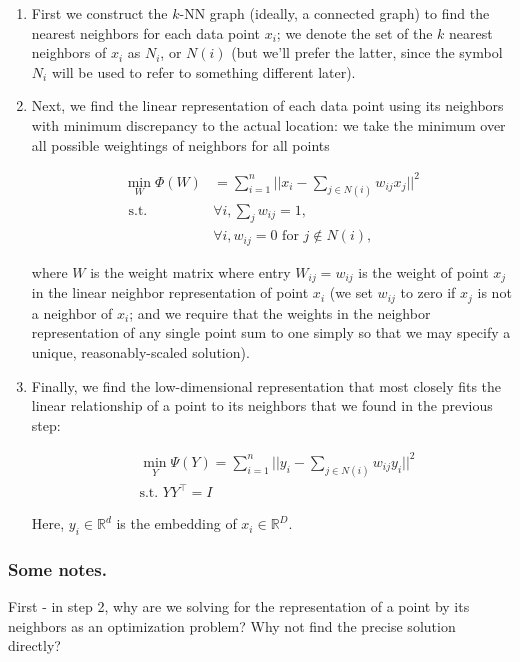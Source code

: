 \begin{enumerate}
\item First we construct the $k$-NN graph (ideally, a connected graph) to find the nearest neighbors for each data point $x_i$; we denote the set of the $k$ nearest neighbors of $x_i$ as $N_i$, or $N(i)$ (but we'll prefer the latter, since the symbol $N_i$ will be used to refer to something different later).

\item Next, we find the linear representation of each data point using its neighbors with minimum discrepancy to the actual location: we take the minimum over all possible weightings of neighbors for all points

\begin{align*}
\min\limits_{W} \Phi(W) &= \sum\limits_{i=1}^n \bigg|\bigg|x_i - \sum\limits_{j\in N(i)} w_{ij} x_j\bigg|\bigg|^2\\
\text{ s.t. } & \forall i, \sum_{j} w_{ij}=1,\\
& \forall i, w_{ij}=0 \text{ for } j \not \in N(i),
\end{align*}

where $W$ is the weight matrix where entry $W_{ij} = w_{ij}$ is the weight of point $x_j$ in the linear neighbor representation of point $x_i$ (we set $w_{ij}$ to zero if $x_j$ is not a neighbor of $x_i$; and we require that the weights in the neighbor representation of any single point sum to one simply so that we may specify a unique, reasonably-scaled solution).

\item Finally, we find the low-dimensional representation that most closely fits the linear relationship of a point to its neighbors that we found in the previous step:

\begin{align*}
&\min_{Y} \Psi(Y) = \sum_{i=1}^{n} ||y_i - \sum_{j\in N(i)} w_{ij}
  y_i||^2\\ 
&\text{s.t. } Y Y^\intercal = I
\end{align*}

Here, $y_i \in \mathbb{R}^d$ is the embedding of $x_i \in \mathbb{R}^D$.
\end{enumerate}

\subsubsection*{Some notes.}
First - in step 2, why are we solving for the representation of a point by its neighbors as an optimization problem? Why not find the precise solution directly?

